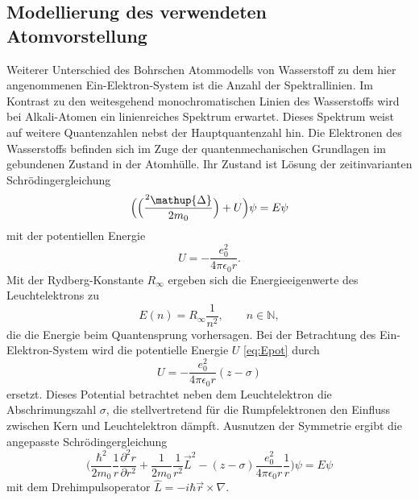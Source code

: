 \subsection{Modellierung des verwendeten Atomvorstellung} %
\label{sub:L_quantenzahl}
Weiterer Unterschied des Bohrschen Atommodells von Wasserstoff zu dem hier angenommenen Ein-Elektron-System ist die Anzahl der Spektrallinien. 
Im Kontrast zu den weitesgehend monochromatischen Linien des Wasserstoffs wird bei Alkali-Atomen ein linienreiches Spektrum erwartet.
Dieses Spektrum weist auf weitere Quantenzahlen nebst der Hauptquantenzahl hin.
Die Elektronen des Wasserstoffs befinden sich im Zuge der quantenmechanischen Grundlagen im gebundenen Zustand in der Atomhülle.
Ihr Zustand ist Lösung der zeitinvarianten Schrödingergleichung
\begin{equation}
	\Bigl(\Bigl(\frac{\hbar^2\mathup{\Delta}}{2 m_0}\Bigr)+U\Bigr)\psi=E\psi
	\label{eq:schroedinger}
\end{equation}
mit der potentiellen Energie 
\begin{equation}
	U=-\frac{e_0^2}{4\pi\epsilon_0 r}.
	\label{eq:Epot}
\end{equation}
Mit der Rydberg-Konstante $R_\infty$ ergeben sich die Energieeigenwerte des Leuchtelektrons zu
\begin{equation}
	E(n)=R_\infty\frac{1}{n^2}, \qquad n\in\mathbb{N},
	\label{eq:EEW}
\end{equation}
die die Energie beim Quantensprung vorhersagen.
Bei der Betrachtung des Ein-Elektron-System wird die potentielle Energie $U$ \eqref{eq:Epot} durch
\begin{equation}
	U=-\frac{e_0^2}{4\pi\epsilon_0 r}(z-\sigma)
	\label{eq:Epot_neu}
\end{equation}
ersetzt.
Dieses Potential betrachtet neben dem Leuchtelektron die Abschrimungszahl $\sigma$, die stellvertretend für die Rumpfelektronen den Einfluss zwischen Kern und Leuchtelektron dämpft.
Ausnutzen der Symmetrie ergibt die angepasste Schrödingergleichung
\begin{equation}
	\biggl(\frac{\hbar^2}{2m_0}\frac{1}{r}\frac{\partial^2 r}{\partial r^2}+\frac{1}{2m_0}\frac{1}{r^2} \vec{L}^2-(z-\sigma)\frac{e_0^2}{4\pi\epsilon_0 r}\frac{1}{r}\biggr)\psi=E\psi
	\label{eq:schroedinger_2}
\end{equation}
mit dem Drehimpulsoperator $\hat{L}=-i\hbar \vec{r}\times\nabla$.

